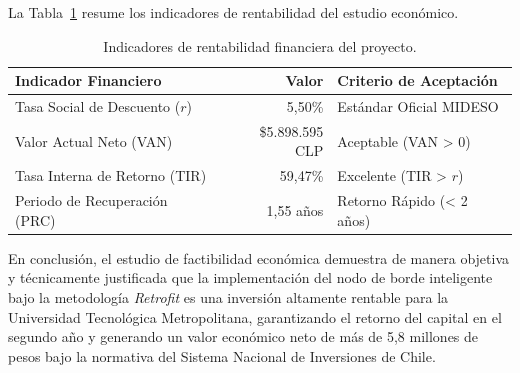 La Tabla~\ref{tab:indicadores} resume los indicadores de rentabilidad del estudio económico.

\begin{table}[H]
    \centering
    \small
    \setlength{\tabcolsep}{5pt}
    \caption{Indicadores de rentabilidad financiera del proyecto.}
    \begin{tabular}{|p{5.5cm}|r|p{3.5cm}|}
        \hline
        \textbf{Indicador Financiero} & \textbf{Valor} & \textbf{Criterio de Aceptación} \\ \hline
        Tasa Social de Descuento ($r$) & 5,50\% & Estándar Oficial MIDESO \cite{MinisterioDesarrolloSocial} \\ \hline
        Valor Actual Neto (VAN) & \$5.898.595 CLP & Aceptable (VAN > 0) \\ \hline
        Tasa Interna de Retorno (TIR) & 59,47\% & Excelente (TIR > $r$) \\ \hline
        Periodo de Recuperación (PRC) & 1,55 años & Retorno Rápido (< 2 años) \\ \hline
    \end{tabular}
    \label{tab:indicadores}
\end{table}

En conclusión, el estudio de factibilidad económica demuestra de manera objetiva y técnicamente justificada que la implementación del nodo de borde inteligente bajo la metodología \textit{Retrofit} es una inversión altamente rentable para la Universidad Tecnológica Metropolitana, garantizando el retorno del capital en el segundo año y generando un valor económico neto de más de 5,8 millones de pesos bajo la normativa del Sistema Nacional de Inversiones de Chile.
